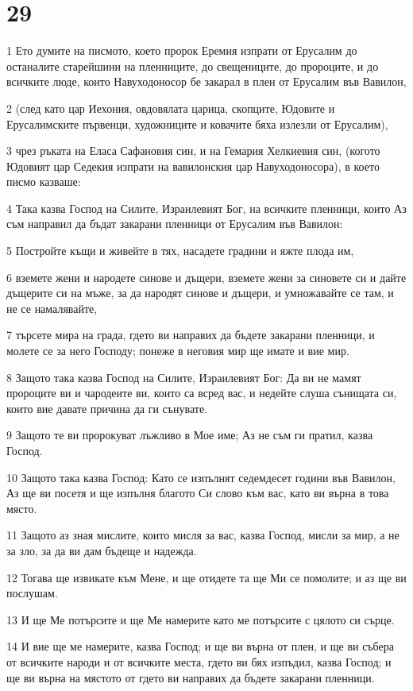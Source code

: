 \chapter{29}

\par 1 Ето думите на писмото, което пророк Еремия изпрати от Ерусалим до останалите старейшини на пленниците, до свещениците, до пророците, и до всичките люде, които Навуходоносор бе закарал в плен от Ерусалим във Вавилон,
\par 2 (след като цар Иехония, овдовялата царица, скопците, Юдовите и Ерусалимските първенци, художниците и ковачите бяха излезли от Ерусалим),
\par 3 чрез ръката на Еласа Сафановия син, и на Гемария Хелкиевия син, (когото Юдовият цар Седекия изпрати на вавилонския цар Навуходоносора), в което писмо казваше:
\par 4 Така казва Господ на Силите, Израилевият Бог, на всичките пленници, които Аз съм направил да бъдат закарани пленници от Ерусалим във Вавилон:
\par 5 Постройте къщи и живейте в тях, насадете градини и яжте плода им,
\par 6 вземете жени и народете синове и дъщери, вземете жени за синовете си и дайте дъщерите си на мъже, за да народят синове и дъщери, и умножавайте се там, и не се намалявайте,
\par 7 търсете мира на града, гдето ви направих да бъдете закарани пленници, и молете се за него Господу; понеже в неговия мир ще имате и вие мир.
\par 8 Защото така казва Господ на Силите, Израилевият Бог: Да ви не мамят пророците ви и чародеите ви, които са всред вас, и недейте слуша сънищата си, които вие давате причина да ги сънувате.
\par 9 Защото те ви пророкуват лъжливо в Мое име; Аз не съм ги пратил, казва Господ.
\par 10 Защото така казва Господ: Като се изпълнят седемдесет години във Вавилон, Аз ще ви посетя и ще изпълня благото Си слово към вас, като ви върна в това място.
\par 11 Защото аз зная мислите, които мисля за вас, казва Господ, мисли за мир, а не за зло, за да ви дам бъдеще и надежда.
\par 12 Тогава ще извикате към Мене, и ще отидете та ще Ми се помолите; и аз ще ви послушам.
\par 13 И ще Ме потърсите и ще Ме намерите като ме потърсите с цялото си сърце.
\par 14 И вие ще ме намерите, казва Господ; и ще ви върна от плен, и ще ви събера от всичките народи и от всичките места, гдето ви бях изпъдил, казва Господ; и ще ви върна на мястото от гдето ви направих да бъдете закарани пленници.
